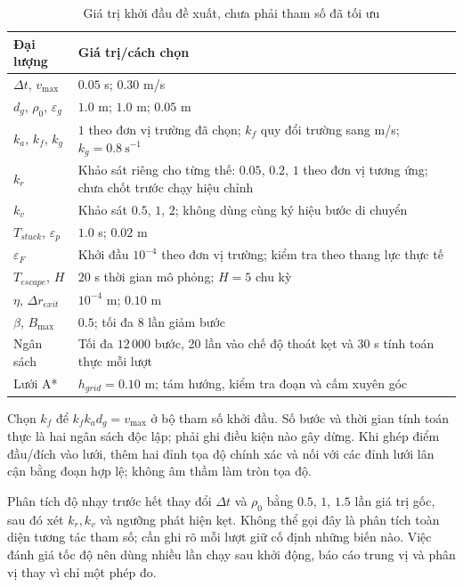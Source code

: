 \documentclass[12pt,a4paper,oneside]{report}
\numberwithin{equation}{chapter}
\begin{document}
\begin{table}[htbp]
\centering\small
\caption{Giá trị khởi đầu đề xuất, chưa phải tham số đã tối ưu}
\begin{tabular}{|>{\raggedright\arraybackslash}p{5.4cm}|>{\raggedright\arraybackslash}p{8.3cm}|}\hline
Đại lượng & Giá trị/cách chọn\\\hline
$\Delta t$, $v_{\max}$ & $0.05$ s; $0.30$ m/s\\\hline
$d_g$, $\rho_0$, $\varepsilon_g$ & $1.0$ m; $1.0$ m; $0.05$ m\\\hline
$k_a$, $k_f$, $k_g$ & $1$ theo đơn vị trường đã chọn; $k_f$ quy đổi trường sang m/s; $k_g=0.8\ \mathrm{s}^{-1}$\\\hline
$k_r$ & Khảo sát riêng cho từng thế: $0.05$, $0.2$, $1$ theo đơn vị tương ứng; chưa chốt trước chạy hiệu chỉnh\\\hline
$k_v$ & Khảo sát $0.5$, $1$, $2$; không dùng cùng ký hiệu bước di chuyển\\\hline
$T_{stuck}$, $\varepsilon_p$ & $1.0$ s; $0.02$ m\\\hline
$\varepsilon_F$ & Khởi đầu $10^{-4}$ theo đơn vị trường; kiểm tra theo thang lực thực tế\\\hline
$T_{escape}$, $H$ & $20$ s thời gian mô phỏng; $H=5$ chu kỳ\\\hline
$\eta$, $\Delta r_{exit}$ & $10^{-4}$ m; $0.10$ m\\\hline
$\beta$, $B_{\max}$ & $0.5$; tối đa 8 lần giảm bước\\\hline
Ngân sách & Tối đa $12\,000$ bước, 20 lần vào chế độ thoát kẹt và 30 s tính toán thực mỗi lượt\\\hline
Lưới A* & $h_{grid}=0.10$ m; tám hướng, kiểm tra đoạn và cấm xuyên góc\\\hline
\end{tabular}
\end{table}

Chọn $k_f$ để $k_f k_a d_g=v_{\max}$ ở bộ tham số khởi đầu. Số bước và thời gian tính toán thực là hai ngân sách độc lập; phải ghi điều kiện nào gây dừng. Khi ghép điểm đầu/đích vào lưới, thêm hai đỉnh tọa độ chính xác và nối với các đỉnh lưới lân cận bằng đoạn hợp lệ; không âm thầm làm tròn tọa độ.

Phân tích độ nhạy trước hết thay đổi $\Delta t$ và $\rho_0$ bằng $0.5$, $1$, $1.5$ lần giá trị gốc, sau đó xét $k_r,k_v$ và ngưỡng phát hiện kẹt. Không thể gọi đây là phân tích toàn diện tương tác tham số; cần ghi rõ mỗi lượt giữ cố định những biến nào. Việc đánh giá tốc độ nên dùng nhiều lần chạy sau khởi động, báo cáo trung vị và phân vị thay vì chỉ một phép đo.
\end{document}
